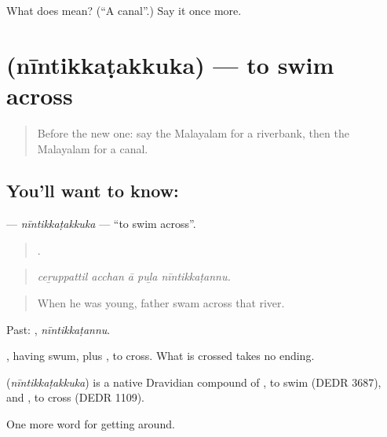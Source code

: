 \begin{tcolorbox}[breakable,colback=teal!4,colframe=teal!35!black,title={Before you move on}]
What does  mean? (\textquotedblleft{}A canal\textquotedblright{}.) Say it once more.
\end{tcolorbox}
\section[\texorpdfstring{\ml{നീന്തിക്കടക്കുക} (nīntikkaṭakkuka)}{നീന്തിക്കടക്കുക (nīntikkaṭakkuka)}]{ (nīntikkaṭakkuka) — to swim across}

\label{lesson:ML-C477-nintikkatakkuka}



\begin{quote}
Before the new one: say the Malayalam for a riverbank, then the Malayalam for a canal.
\end{quote}

\subsection*{You'll want to know: }
\textbf{} — \emph{nīntikkaṭakkuka} — \textquotedblleft{}to swim across\textquotedblright{}.

\begin{quote}
    .
\end{quote}

\begin{quote}
\emph{ceṟuppattil acchan ā puḻa nīntikkaṭannu.}
\end{quote}

\begin{quote}
When he was young, father swam across that river.
\end{quote}

Past: , \emph{nīntikkaṭannu}.

, having swum, plus , to cross. What is crossed takes no ending.

\begin{cousinweb}
\textbf{} (\emph{nīntikkaṭakkuka}) is a native Dravidian compound of , to swim (DEDR 3687), and , to cross (DEDR 1109).
\end{cousinweb}

\begin{grammarlens}[title={What you've built}]
One more word for getting around.
\end{grammarlens}

